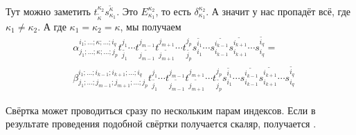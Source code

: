 \documentclass{article}
\begin{document}
\begin{itemize}
\begin{Proof}
\[\begin{split}
            \end{split}
            \]
            Тут можно заметить $t^{\kappa_2}_{\widetilde\kappa}s^{\widetilde\kappa}_{\kappa_1}$. Это $E^{\kappa_2}_{\kappa_1}$, то есть $\delta^{\kappa_2}_{\kappa_1}$. А значит у нас пропадёт всё, где $\kappa_1\neq\kappa_2$. А где $\kappa_1=\kappa_2=\kappa$, мы получаем
            \[
            \begin{split}
                &\alpha^{i_1;\ldots;\kappa;\ldots;i_q}_{j_1;\ldots;\kappa;\ldots;j_p}t_{\widetilde{j_1}}^{j_1}\cdots t_{\widetilde{j_{m-1}}}^{j_{m-1}}t_{\widetilde{j_{m+1}}}^{j_{m+1}}\cdots t_{\widetilde{j_p}}^{j_p}s_{i_1}^{\widetilde{i_1}}\cdots s_{i_{k-1}}^{\widetilde{i_{k-1}}}s_{i_{k+1}}^{\widetilde{i_{k+1}}}\cdots s_{i_q}^{\widetilde{i_q}}=\\
                &\beta^{i_1;\ldots;i_{k-1};i_{k+1};\ldots;i_q}_{j_1;\ldots;j_{m-1};j_{m+1};\ldots;j_p}t_{\widetilde{j_1}}^{j_1}\cdots t_{\widetilde{j_{m-1}}}^{j_{m-1}}t_{\widetilde{j_{m+1}}}^{j_{m+1}}\cdots t_{\widetilde{j_p}}^{j_p}s_{i_1}^{\widetilde{i_1}}\cdots s_{i_{k-1}}^{\widetilde{i_{k-1}}}s_{i_{k+1}}^{\widetilde{i_{k+1}}}\cdots s_{i_q}^{\widetilde{i_q}}
            \end{split}
            \]
        \end{Proof}
        \dfn Свёртка может проводиться сразу по нескольким парам индексов. Если в результате проведения подобной свёртки получается скаляр, получается .
    \end{itemize}
\end{document}
